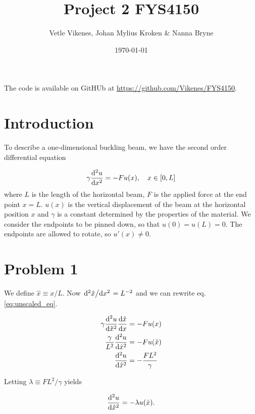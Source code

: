 \documentclass[english,notitlepage,nofootinbib]{revtex4-1}  %
\begin{document}
\title{Project 2 FYS4150}      %
\author{Vetle Vikenes, Johan Mylius Kroken \& Nanna Bryne}          %
\date{\today}                             %
\noaffiliation                            %


\maketitle 
    
The code is available on GitHUb at \url{https://github.com/Vikenes/FYS4150}.
    

\section*{Introduction}

To describe a one-dimensional buckling beam, we have the second order differential equation 

\begin{align}\label{eq:unscaled_eq}
    \gamma \dv[2]{u}{x} = -F u(x), \quad x\in [0,L]
\end{align}
where $L$ is the length of the horizontal beam, $F$ is the applied force at the end point $x=L$. $u(x)$ is the vertical displacement of the beam at the horizontal position $x$ and $\gamma$ is a constant determined by the properties of the material. We consider the endpoints to be pinned down, so that $u(0)=u(L)=0$. The endpoints are allowed to rotate, so $u'(x)\neq0$.

\section*{Problem 1}

We define $\hat{x}\equiv x/L$. Now $\dv*[2]{\hat{x}}{x}=L^{-2}$ and we can rewrite eq. \eqref{eq:unscaled_eq}.

\begin{align*}
    \gamma \dv[2]{u}{\hat{x}} \dv{\hat{x}}{x} & = -Fu(x) \\
    \frac{\gamma}{L^2} \dv[2]{u}{\hat{x}} &= -Fu(\hat{x}) \\
    \dv[2]{u}{\hat{x}} &= - \frac{FL^2}{\gamma}
\end{align*}

Letting $\lambda \equiv FL^2/\gamma$ yields

\begin{align}\label{p1_scaled_eq}
    \dv[2]{u}{\hat{x}} = -\lambda u(\hat{x}).
\end{align}
\end{document}
